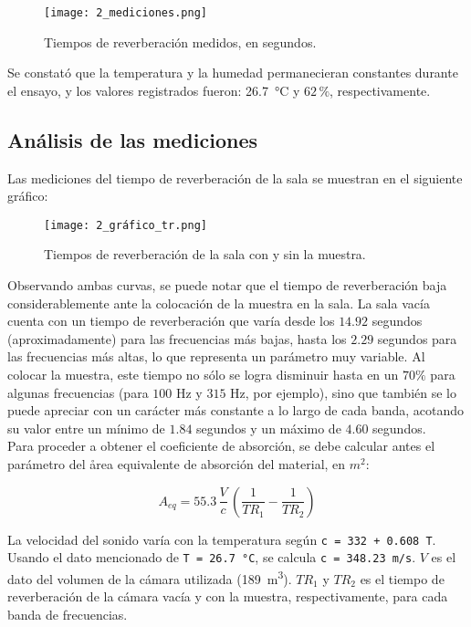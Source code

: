 		\begin{figure}[H]
			\centering
			\texttt{[image: 2\_mediciones.png]}\\
			\caption{Tiempos de reverberación medidos, en segundos.}
			\label{2_mediciones}
		\end{figure}
		
		Se constató que la temperatura y la humedad permanecieran constantes durante el ensayo, y los valores registrados fueron: \SI{26.7}{\celsius} y $62\,\%$, respectivamente.\\
		
		\subsection{Análisis de las mediciones}
		
		Las mediciones del tiempo de reverberación de la sala se muestran en el siguiente gráfico:

		\begin{figure}[H]
			\centering
			\texttt{[image: 2\_gráfico\_tr.png]}\\
			\caption{Tiempos de reverberación de la sala con y sin la muestra.}
			\label{2_gráfico_tr}
		\end{figure}
		
		Observando ambas curvas, se puede notar que el tiempo de reverberación baja considerablemente ante la colocación de la muestra en la sala. La sala vacía cuenta con un tiempo de reverberación que varía desde los $14.92$ segundos (aproximadamente) para las frecuencias más bajas, hasta los $2.29$ segundos para las frecuencias más altas, lo que representa un parámetro muy variable. Al colocar la muestra, este tiempo no sólo se logra disminuir hasta en un $70 \%$ para algunas frecuencias (para $100$ Hz y $315$ Hz, por ejemplo), sino que también se lo puede apreciar con un carácter más constante a lo largo de cada banda, acotando su valor entre un mínimo de $1.84$ segundos y un máximo de $4.60$ segundos.\\
		
		Para proceder a obtener el coeficiente de absorción, se debe calcular antes el parámetro del årea equivalente de absorción del material, en $m^2$:
		
		\begin{equation}
			A_{eq} = 55.3 \, \frac{V}{c} \, \left(\frac{1}{TR_1} - \frac{1}{TR_2}\right)
		\end{equation}
		
		La velocidad del sonido varía con la temperatura según \texttt{c = 332 + 0.608\,T}. Usando el dato mencionado de \texttt{T = \SI{26.7}{\celsius}}, se calcula \texttt{c = \SI{348.23}{\meter/\second}}. \texttt{$V$} es el dato del volumen de la cámara utilizada (\SI{189}{\cubic\meter}). \texttt{$TR_1$} y \texttt{$TR_2$} es el tiempo de reverberación de la cámara vacía y con la muestra, respectivamente, para cada banda de frecuencias.\\
		
